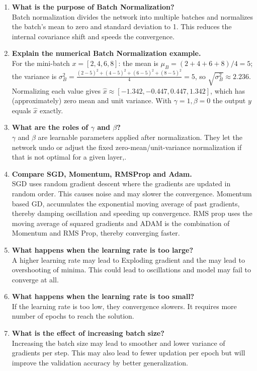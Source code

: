 \documentclass[10pt]{article}
\begin{document}
\begin{enumerate}
\item \textbf{What is the purpose of Batch Normalization?}\\
Batch normalization divides the network into multiple batches and normalizes the batch's mean to zero and standard deviation to 1. This reduces the internal covariance shift and speeds the convergence.

\item \textbf{Explain the numerical Batch Normalization example.}\\
For the mini-batch $x=[2,4,6,8]$: the mean is
$\mu_B=(2+4+6+8)/4=5$; the variance is
$\sigma_B^2=\frac{(2-5)^2+(4-5)^2+(6-5)^2+(8-5)^2}{4}=5$, so
$\sqrt{\sigma_B^2}\approx2.236$. Normalizing each value gives
$\hat{x}\approx[-1.342,-0.447,0.447,1.342]$, which has (approximately)
zero mean and unit variance. With $\gamma=1,\beta=0$ the output $y$
equals $\hat{x}$ exactly.

\item \textbf{What are the roles of $\gamma$ and $\beta$?}\\
$\gamma$ and $\beta$ are learnable parameters applied after normalization. They let the network undo or adjust the fixed zero-mean/unit-variance normalization if that is not optimal for a given layer,.

\item \textbf{Compare SGD, Momentum, RMSProp and Adam.}\\
SGD uses random gradient descent where the gradients are updated in random order. This causes noise and may slower the convergence. Momentum based GD, accumulates the exponential moving average of past gradients, thereby damping oscillation and speeding up convergence. RMS prop uses the moving average of squared gradients and ADAM is the combination of Momentum and RMS Prop, thereby converging faster.

\item \textbf{What happens when the learning rate is too large?}\\
A higher learning rate may lead to Exploding gradient and the may lead to overshooting of minima. This could lead to oscillations and model may fail to converge at all.

\item \textbf{What happens when the learning rate is too small?}\\
If the learning rate is too low, they convergence slowers. It requires more number of epochs to reach the solution.

\item \textbf{What is the effect of increasing batch size?}\\
Increasing the batch size may lead to smoother and lower variance of gradients per step. This may also lead to fewer updation per epoch but will improve the validation accuracy by better generalization.


\end{enumerate}
\end{document}
